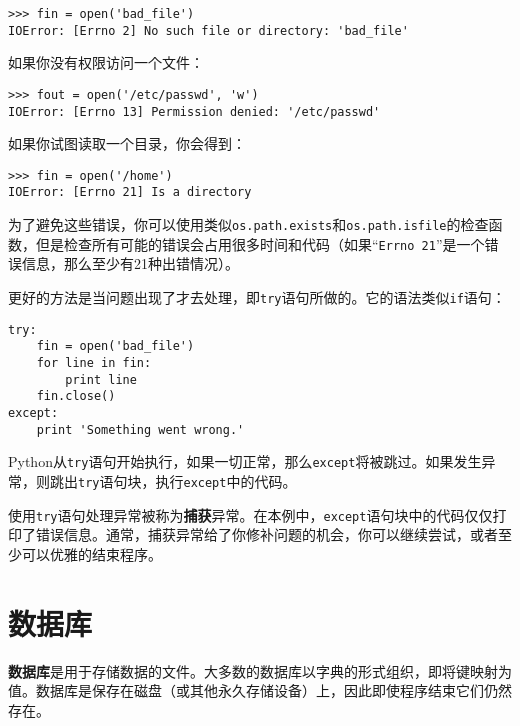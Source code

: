 
\beforeverb
\begin{verbatim}
>>> fin = open('bad_file')
IOError: [Errno 2] No such file or directory: 'bad_file'
\end{verbatim}
\afterverb
%
如果你没有权限访问一个文件：


\beforeverb
\begin{verbatim}
>>> fout = open('/etc/passwd', 'w')
IOError: [Errno 13] Permission denied: '/etc/passwd'
\end{verbatim}
\afterverb
%
如果你试图读取一个目录，你会得到：

\beforeverb
\begin{verbatim}
>>> fin = open('/home')
IOError: [Errno 21] Is a directory
\end{verbatim}
\afterverb
%
为了避免这些错误，你可以使用类似{\tt os.path.exists}和{\tt os.path.isfile}的检查函数，但是检查所有可能的错误会占用很多时间和代码（如果“{\tt Errno 21}”是一个错误信息，那么至少有21种出错情况）。


更好的方法是当问题出现了才去处理，即{\tt try}语句所做的。它的语法类似{\tt if}语句：

\beforeverb
\begin{verbatim}
try:    
    fin = open('bad_file')
    for line in fin:
        print line
    fin.close()
except:
    print 'Something went wrong.'
\end{verbatim}
\afterverb
%
Python从{\tt try}语句开始执行，如果一切正常，那么{\tt except}将被跳过。如果发生异常，则跳出{\tt try}语句块，执行{\tt except}中的代码。

使用{\tt try}语句处理异常被称为{\bf 捕获}异常。在本例中，{\tt except}语句块中的代码仅仅打印了错误信息。通常，捕获异常给了你修补问题的机会，你可以继续尝试，或者至少可以优雅的结束程序。


\section{数据库}


{\bf 数据库}是用于存储数据的文件。大多数的数据库以字典的形式组织，即将键映射为值。数据库是保存在磁盘（或其他永久存储设备）上，因此即使程序结束它们仍然存在。



